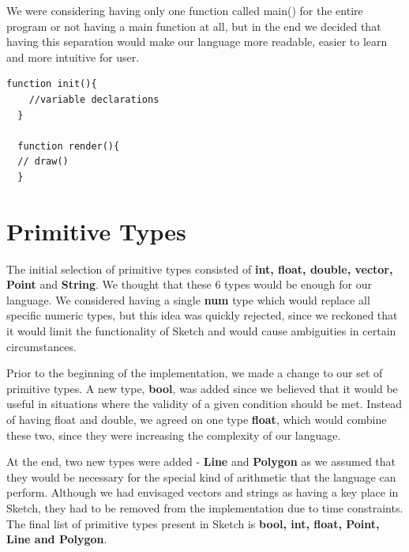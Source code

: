 \documentclass{l3proj}
\begin{document}
We were considering having only one function called main() for the entire program or not having a main function at all, but in the end we decided that having this separation would make our language more readable, easier to learn and more intuitive for user.
\begin{center}
\lstset{
    basicstyle=\small\ttfamily,
    frame=lrtb,
  }
 

 
  \begin{lstlisting}[caption= {Main program in Sketch}, label= {main}]
  function init(){
    //variable declarations
  }
 
  function render(){
  // draw()
  }
  \end{lstlisting}
  \end{center}
 
\section{Primitive Types}
The initial selection of primitive types consisted of \textbf{int, float, double, vector, Point} and \textbf{String}. We thought that these 6 types would be enough for our language. We considered having a single \textbf{num} type which would replace all specific numeric types, but this idea was quickly rejected, since we reckoned that it would limit the functionality of Sketch and would cause ambiguities in certain circumstances.

Prior to the beginning of the implementation, we made a change to our set of primitive types.  A new type, \textbf{bool}, was added since we believed that it would be useful in situations where the validity of a given condition should be met. Instead of having float and double, we agreed on one type \textbf{float}, which would combine these two, since they were increasing the complexity of our language.  

At the end, two new types were added - \textbf{Line} and \textbf{Polygon} as we assumed that they would be necessary for the special kind of arithmetic that the language can perform. Although we had envisaged vectors and strings as having a key place in Sketch, they had to be removed from the implementation due to time constraints. The final list of primitive types present in Sketch is \textbf{bool, int, float, Point, Line and Polygon}.
\end{document}

